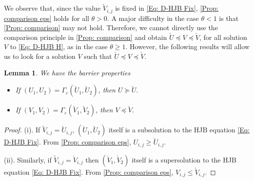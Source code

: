 \documentclass[11pt]{article}
\numberwithin{equation}{section}
\numberwithin{algorithm}{section}
\newtheorem{lemma}[lemma]{Lemma}
\newcommand{\eps}{\varepsilon}
\theoremstyle{plain}
\begin{document}
We observe that, since the value $\widetilde{V}_{i,j}$ is fixed in \cref{Eq: D-HJB Fix}, \cref{Prop: comparison eps} holds for all $\theta>0$. A major difficulty in the case $\theta<1$ is that \cref{Prop: comparison} may not hold. Therefore, we cannot directly use the comparison principle in \cref{Prop: comparison} and obtain $\check{U}\preceq {V}\preceq \check{V}$, for all solution $V$ to \cref{Eq: D-HJB H}, as in the case $\theta\geq 1$. However, the following results will allow us to look for a solution $V$ such that $\check{U}\preceq {V}\preceq \check{V}$. 
\begin{lemma}\label{Lemma: early barrier}
We have the barrier properties
\begin{itemize}
\item[(i).] If $({U}_1,{U}_2)=\Gamma_{\eps}(\check{U}_1,\check{U}_2)$, then
$
{U}\succeq \check{U}.
$
\item[(ii).] If $({V}_1,{V}_2)=\Gamma_{\eps}(\check{V}_1,\check{V}_2)$, then
$
{V}\preceq \check{V}.
$
\end{itemize}
\end{lemma}
\begin{proof}
(i). If $\widetilde{V}_{i,j}=\check{U}_{i,j}$, $(\check{U}_1,\check{U}_2)$ itself is a subsolution to the HJB equation \cref{Eq: D-HJB Fix}. From \cref{Prop: comparison eps}, ${U}_{i,j}\geq \check{U}_{i,j}$. \par
(ii). Similarly, if $\widetilde{V}_{i,j}=\check{V}_{i,j}$ then $(\check{V}_1,\check{V}_2)$ itself is a supersolution to the HJB equation \cref{Eq: D-HJB Fix}. From \cref{Prop: comparison eps}, ${V}_{i,j}\leq \check{V}_{i,j}$. 
\end{proof}
\end{document}
